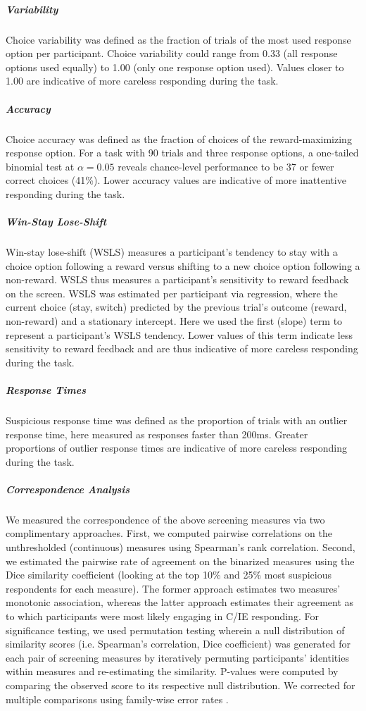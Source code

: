 \documentclass[a4paper,notitlepage,12pt]{article}
\begin{document}
\begin{refsection}[main]
\subparagraph{Variability} Choice variability was defined as the fraction of trials of the most used response option per participant. Choice variability could range from 0.33 (all response options used equally) to 1.00 (only one response option used). Values closer to 1.00 are indicative of more careless responding during the task.  

\subparagraph{Accuracy} Choice accuracy was defined as the fraction of choices of the reward-maximizing response option. For a task with 90 trials and three response options, a one-tailed binomial test at $\alpha=0.05$ reveals chance-level performance to be 37 or fewer correct choices (41\%). Lower accuracy values are indicative of more inattentive responding during the task.

\subparagraph{Win-Stay Lose-Shift} Win-stay lose-shift (WSLS) measures a participant's tendency to stay with a choice option following a reward versus shifting to a new choice option following a non-reward. WSLS thus measures a participant's sensitivity to reward feedback on the screen. WSLS was estimated per participant via regression, where the current choice (stay, switch) predicted by the previous trial's outcome (reward, non-reward) and a stationary intercept. Here we used the first (slope) term to represent a participant's WSLS tendency. Lower values of this term indicate less sensitivity to reward feedback and are thus indicative of more careless responding during the task.

\subparagraph{Response Times} Suspicious response time was defined as the proportion of trials with an outlier response time, here measured as responses faster than 200ms. Greater proportions of outlier response times are indicative of more careless responding during the task.  

\subparagraph{Correspondence Analysis} We measured the correspondence of the above screening measures via two complimentary approaches. First, we computed pairwise correlations on the unthresholded (continuous) measures using Spearman's rank correlation. Second, we estimated the pairwise rate of agreement on the binarized measures using the Dice similarity coefficient (looking at the top 10\% and 25\% most suspicious respondents for each measure). The former approach estimates two measures' monotonic association, whereas the latter approach estimates their agreement as to which participants were most likely engaging in C/IE responding. For significance testing, we used permutation testing wherein a null distribution of similarity scores (i.e. Spearman's correlation, Dice coefficient) was generated for each pair of screening measures by iteratively permuting participants' identities within measures and re-estimating the similarity. P-values were computed by comparing the observed score to its respective null distribution. We corrected for multiple comparisons using family-wise error rates \cite{winkler2014permutation}.


\end{refsection}
\end{document}
